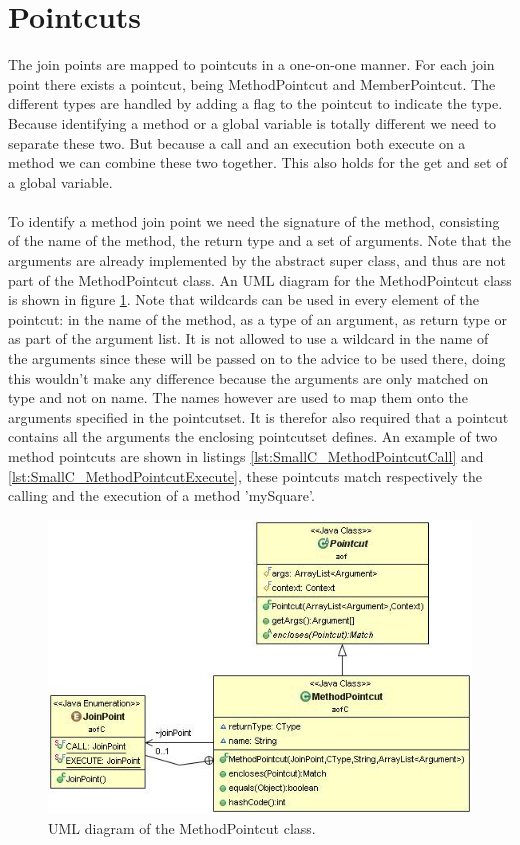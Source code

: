 \documentclass[a4paper]{report}
\begin{document}
\section{Pointcuts}
The join points are mapped to pointcuts in a one-on-one manner. For each join point there exists a pointcut, being MethodPointcut and MemberPointcut. The different types are handled by adding a flag to the pointcut to indicate the type. Because identifying a method or a global variable is totally different we need to separate these two. But because a call and an execution both execute on a method we can combine these two together. This also holds for the get and set of a global variable.\\
\\
To identify a method join point we need the signature of the method, consisting of the name of the method, the return type and a set of arguments. Note that the arguments are already implemented by the abstract super class, and thus are not part of the MethodPointcut class. An UML diagram for the MethodPointcut class is shown in figure \ref{fig:MethodPointcut}. Note that wildcards can be used in every element of the pointcut: in the name of the method, as a type of an argument, as  return type or as part of the argument list. It is not allowed to use a wildcard in the name of the arguments since these will be passed on to the advice to be used there, doing this wouldn't make any difference because the arguments are only matched on type and not on name. The names however are used to map them onto the arguments specified in the pointcutset. It is therefor also required that a pointcut contains all the arguments the enclosing pointcutset defines. An example of two method pointcuts are shown in listings \ref{lst:SmallC_MethodPointcutCall} and \ref{lst:SmallC_MethodPointcutExecute}, these pointcuts match respectively the calling and the execution of a method 'mySquare'.\\
\begin{figure}
\centering
\includegraphics[scale=0.7]{images/AOFC/MethodPointcut.jpg}
\caption{UML diagram of the MethodPointcut class.}
\label{fig:MethodPointcut}
\end{figure}\\
\end{document}
